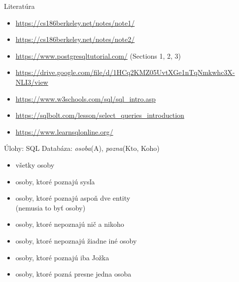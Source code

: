 \documentclass[12pt]{beamer}
\begin{document}
\begin{frame}{Literatúra}
\begin{itemize}
\item {\scriptsize\url{https://cs186berkeley.net/notes/note1/}}
\item {\scriptsize\url{https://cs186berkeley.net/notes/note2/}}
\item {\scriptsize\url{https://www.postgresqltutorial.com/} (Sections 1, 2, 3)}
\item {\scriptsize\url{https://drive.google.com/file/d/1HCq2KMZ05UvtXGe1nTqNmkwhc3X-NLI3/view}}
\item {\scriptsize\url{https://www.w3schools.com/sql/sql_intro.asp}}
\item {\scriptsize\url{https://sqlbolt.com/lesson/select_queries_introduction}}
\item {\scriptsize\url{https://www.learnsqlonline.org/}}
\end{itemize}
\end{frame}


\begin{frame}{Úlohy: SQL}
Databáza: \emph{osoba}(A), \emph{pozna}(Kto, Koho)
\begin{itemize}
	\item všetky osoby
    \item osoby, ktoré poznajú sysľa
    \item osoby, ktoré poznajú aspoň dve entity\\ (nemusia to byť osoby)
    \item osoby, ktoré nepoznajú nič a nikoho
    \item osoby, ktoré nepoznajú žiadne iné osoby
    \item osoby, ktoré poznajú iba Jožka
    \item osoby, ktoré pozná presne jedna osoba
\end{itemize}
\end{frame}
\end{document}
